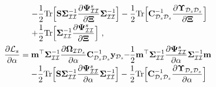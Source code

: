 \documentclass[conference]{IEEEtran}
\begin{document}
\begin{equation*}
\begin{array}{l}
				\displaystyle\qquad\quad\ -\frac{1}{2}\mathrm{Tr}\Big[\mathbf{S}\mathbf{\Sigma}_\mathcal{II}^{-1}\dfrac{\partial\mathbf{\Psi}_\mathcal{II}^{s}}{\partial\mathbf{\Xi}}\mathbf{\Sigma}_\mathcal{II}^{-1}\Big]-\frac{1}{2}\mathrm{Tr}\Big[\mathbf{C}_{\mathcal{D}_s\mathcal{D}_s}^{-1}\dfrac{\partial\mathbf{\Upsilon}_{\mathcal{D}_s\mathcal{D}_s}}{\partial\mathbf{\Xi}}\Big]\vspace{1mm}\\
				\displaystyle\qquad\quad\ +\frac{1}{2}\mathrm{Tr}\Big[\mathbf{\Sigma}_\mathcal{II}^{-1}\dfrac{\partial\mathbf{\Psi}_\mathcal{II}^{s}}{\partial\mathbf{\Xi}}\Big]\ ,\vspace{2mm}\\
				\displaystyle\dfrac{\partial{\mathcal{L}}_s}{\partial \alpha}=\mathbf{m}^\top\mathbf{\Sigma}_\mathcal{II}^{-1}\dfrac{\partial\mathbf{\Omega}_{\mathcal{I}\mathcal{D}_s}}{\partial \alpha}\mathbf{C}_{\mathcal{D}_s\mathcal{D}_s}^{-1}\mathbf{y}_{\mathcal{D}_s}\hspace{-1mm}-\hspace{-1mm}\frac{1}{2}\mathbf{m}^\top\mathbf{\Sigma}_\mathcal{II}^{-1}\dfrac{\partial\mathbf{\Psi}_\mathcal{II}^{s}}{\partial \alpha}\mathbf{\Sigma}_\mathcal{II}^{-1}\mathbf{m}\vspace{1mm}\\ \displaystyle\qquad\quad\;-\frac{1}{2}\mathrm{Tr}\Big[\mathbf{S}\mathbf{\Sigma}_\mathcal{II}^{-1}\dfrac{\partial\mathbf{\Psi}_\mathcal{II}^{s}}{\partial \alpha}\mathbf{\Sigma}_\mathcal{II}^{-1}\Big] 
				-\frac{1}{2}\mathrm{Tr}\Big[\mathbf{C}_{\mathcal{D}_s\mathcal{D}_s}^{-1}\dfrac{\partial\mathbf{\Upsilon}_{\mathcal{D}_s\mathcal{D}_s}}{\partial \alpha}\Big]\vspace{1mm} \\

\end{array}
\end{equation*}
\end{document}
